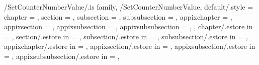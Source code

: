 \pgfkeys
{
  /SetCounterNumberValue/.is family, /SetCounterNumberValue,
  default/.style =
  {
    chapter = \empty,
    section = \empty,
    subsection = \empty,
    subsubsection = \empty,
    appixchapter = \empty,
    appixsection = \empty,
    appixsubsection = \empty,
    appixsubsubsection = \empty,
  },
  chapter/.estore in = \TmpValueChapter,
  section/.estore in = \TmpValueSection,
  subsection/.estore in = \TmpValueSubSection,
  subsubsection/.estore in = \TmpValueSubSubSection,
  appixchapter/.estore in = \TmpValueAppixChapter,
  appixsection/.estore in = \TmpValueAppixSection,
  appixsubsection/.estore in = \TmpValueAppixSubSection,
  appixsubsubsection/.estore in = \TmpValueAppixSubSubSection,
} %

\newcommand{\SetCounterNumberValue}[1][\empty]
{%
  \pgfkeys{/SetCounterNumberValue, default, #1}%
  \ifthenelse{\equal{\TmpValueChapter}{\empty}}{}%
  {%
    \renewcommand\VarCounterNumberChapterNumber{#1}%
  }%
  \ifthenelse{\equal{\TmpValueSection}{\empty}}{}%
  {%
    \renewcommand\VarCounterNumberSectionNumber{#1}%
  }%
  \ifthenelse{\equal{\TmpValueSubSection}{\empty}}{}%
  {%
    \renewcommand\VarCounterNumberSSectionNumber{#1}%
  }%
  \ifthenelse{\equal{\TmpValueSubSubSection}{\empty}}{}%
  {%
    \renewcommand\VarCounterNumberSSSectionNumber{#1}%
  }%
  \ifthenelse{\equal{\TmpValueAppixChapter}{\empty}}{}%
  {%
    \renewcommand\VarCounterNumberAppixChapterNumber{#1}%
  }%
  \ifthenelse{\equal{\TmpValueAppixSection}{\empty}}{}%
  {%
    \renewcommand\VarCounterNumberAppixSectionNumber{#1}%
  }%
  \ifthenelse{\equal{\TmpValueAppixSubSection}{\empty}}{}%
  {%
    \renewcommand\VarCounterNumberAppixSSectionNumber{#1}%
  }%
  \ifthenelse{\equal{\TmpValueAppixSubSubSection}{\empty}}{}%
  {%
    \renewcommand\VarCounterNumberAppixSSSectionNumber{#1}%
  }%
} %

\newcommand\TypeCounter{}

\newcommand\StyleCNumChiNum{\zhnum{chapter}}
\newcommand\StyleCNumTiangan{\zhtiangan{\value{chapter}}}
\newcommand\StyleCNumArabic{\appto\TypeCounter{arabic}\arabic{chapter}}
\newcommand\StyleCNumLowerRoman{\roman{chapter}}
\newcommand\StyleCNumUpperRoman{\Roman{chapter}}
\newcommand\StyleCNumLowerAlph{\alph{chapter}}
\newcommand\StyleCNumUpperAlph{\Alph{chapter}}

\newcommand\StyleSNumChiNum{\zhnum{section}}
\newcommand\StyleSNumTiangan{\zhtiangan{\value{section}}}
\newcommand\StyleSNumArabic{\arabic{section}}
\newcommand\StyleSNumLowerRoman{\roman{section}}
\newcommand\StyleSNumUpperRoman{\Roman{section}}
\newcommand\StyleSNumLowerAlph{\alph{section}}
\newcommand\StyleSNumUpperAlph{\Alph{section}}

